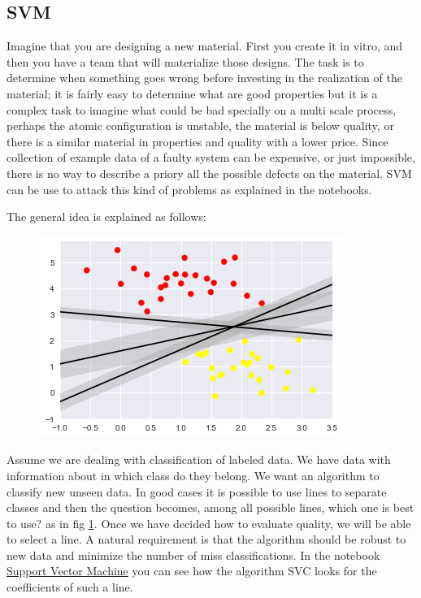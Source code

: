 \documentclass[11pt,letterpaper]{report}
\begin{document}
 	
 	
	\subsection{SVM}
	Imagine that you are designing a new material. First you create it in vitro, and then you have a team that will materialize those designs. The task is to determine when something goes wrong before investing in the realization of the material; it is fairly easy to determine what are good properties but it is a complex task to imagine what could be bad specially on a multi scale process, perhaps the atomic configuration is unstable, the material is below quality, or there is a similar  material in properties and quality  with a lower price.  Since collection of example data of a faulty system  can be expensive, or just impossible,  there is no way to describe a priory all the possible defects on the material. SVM can be use to attack this kind of problems as explained in the notebooks.
	
	The general idea is explained as follows:
	\begin{figure}[h!]
		\centering
		\includegraphics[width=0.45\linewidth]{figures/svcl.png}
		\caption{}
		\label{fig:lines}
	\end{figure} 
	
	Assume we are dealing with classification of labeled data. We have data with information about in which class do they belong. We want an algorithm to classify new unseen data. In good cases it is possible to use lines to separate classes and then the question becomes, among all possible lines, which one is best to use? as in fig \ref{fig:lines}. Once we have decided how to evaluate quality, we will be able to select a line. A natural requirement is that the algorithm should be robust to new data and minimize the number of miss classifications. In the notebook \href{ http://nbviewer.jupyter.org/mendozacortesgroup/machine_learning_class/blob/master/Lectures_Jupyter/L7_Support_Vector_Machine/SVM.ipynb}{Support Vector Machine} you can see how the algorithm SVC looks for  the coefficients of such a line.
\end{document}
